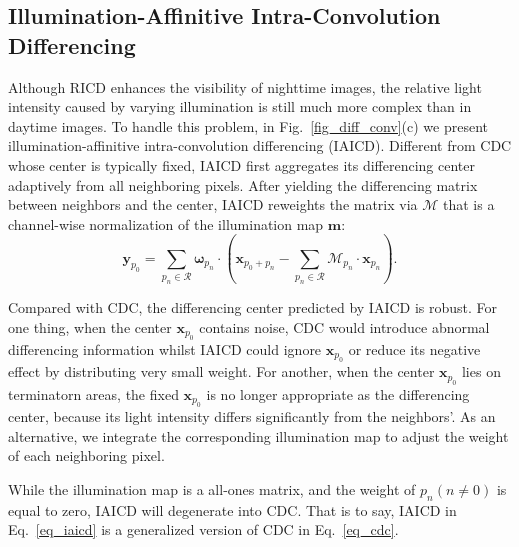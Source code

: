 \documentclass{article}
\begin{document}
\subsection{Illumination-Affinitive Intra-Convolution Differencing}\label{sec_IAICD}
Although RICD enhances the visibility of nighttime images, the relative light intensity caused by varying illumination is still much more complex than in daytime images. To handle this problem, in Fig.~\ref{fig_diff_conv}(c) we present illumination-affinitive intra-convolution differencing (IAICD). Different from CDC \cite{yu2020searching} whose center is typically fixed, IAICD first aggregates its differencing center adaptively from all neighboring pixels. After yielding the differencing matrix between neighbors and the center, IAICD reweights the matrix via $\mathcal{M}$ that is a channel-wise normalization of the illumination map $\boldsymbol m$: 
\begin{equation}\label{eq_iaicd}
\boldsymbol y_{p_0}=\sum_{p_n\in \mathcal{R}}{\boldsymbol \omega_{p_n} \cdot ( \boldsymbol x_{p_0 + p_n} - \sum_{p_n\in \mathcal{R}}{\mathcal{M}_{p_n} \cdot \boldsymbol x_{p_n}} )}.
\end{equation}

Compared with CDC, the differencing center predicted by IAICD is robust. For one thing, when the center $\boldsymbol x_{p_0}$ contains noise, CDC would introduce abnormal differencing information whilst IAICD could ignore $\boldsymbol x_{p_0}$ or reduce its negative effect by distributing very small weight. For another, when the center $\boldsymbol x_{p_0}$ lies on terminatorn areas, the fixed $\boldsymbol x_{p_0}$ is no longer appropriate as the differencing center, because its light intensity differs significantly from the neighbors'. As an alternative, we integrate the corresponding illumination map to adjust the weight of each neighboring pixel. 

While the illumination map is a all-ones matrix, and the weight of $p_n (n\neq 0)$ is equal to zero, IAICD will degenerate into CDC. That is to say, IAICD in Eq.~\ref{eq_iaicd} is a generalized version of CDC in Eq.~\ref{eq_cdc}.
\end{document}
